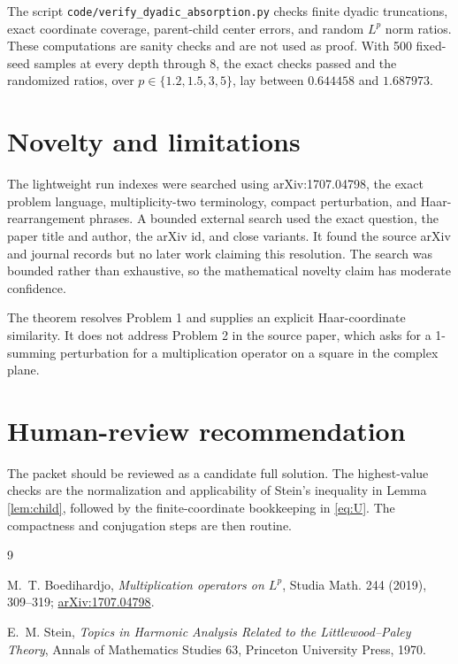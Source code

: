 \documentclass[11pt]{article}
\begin{document}
The script \texttt{code/verify\_dyadic\_absorption.py} checks finite dyadic
truncations, exact coordinate coverage, parent-child center errors, and random
$L^p$ norm ratios. These computations are sanity checks and are not used as
proof. With 500 fixed-seed samples at every depth through 8, the exact checks
passed and the randomized ratios, over $p\in\{1.2,1.5,3,5\}$, lay between
$0.644458$ and $1.687973$.

\section{Novelty and limitations}

The lightweight run indexes were searched using arXiv:1707.04798, the exact
problem language, multiplicity-two terminology, compact perturbation, and
Haar-rearrangement phrases. A bounded external search used the exact question,
the paper title and author, the arXiv id, and close variants. It found the
source arXiv and journal records but no later work claiming this resolution.
The search was bounded rather than exhaustive, so the mathematical novelty
claim has moderate confidence.

The theorem resolves Problem 1 and supplies an explicit Haar-coordinate
similarity. It does not address Problem 2 in the source paper, which asks for a
1-summing perturbation for a multiplication operator on a square in the
complex plane.

\section{Human-review recommendation}

The packet should be reviewed as a candidate full solution. The highest-value
checks are the normalization and applicability of Stein's inequality in
Lemma \ref{lem:child}, followed by the finite-coordinate bookkeeping in
\eqref{eq:U}. The compactness and conjugation steps are then routine.

\begin{thebibliography}{9}

M.~T. Boedihardjo,
\emph{Multiplication operators on $L^p$},
Studia Math. 244 (2019), 309--319;
\href{https://arxiv.org/abs/1707.04798}{arXiv:1707.04798}.

E.~M. Stein,
\emph{Topics in Harmonic Analysis Related to the Littlewood--Paley Theory},
Annals of Mathematics Studies 63, Princeton University Press, 1970.

\end{thebibliography}
\end{document}
